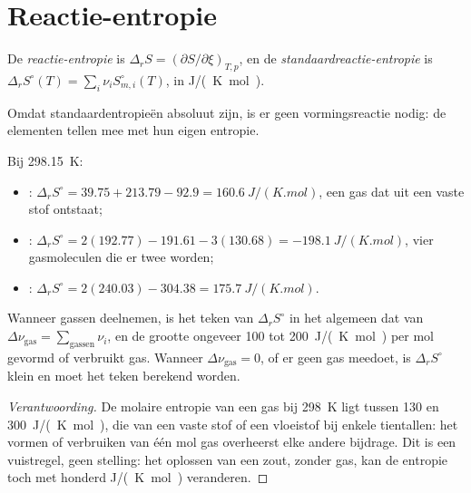 \section{Reactie-entropie}

\begin{definition}\label{def:b2:reaction-free-energy:reaction-entropy}
De \emph{reactie-entropie} is $\Delta_r S =
(\partial S/\partial\xi)_{T,p}$, en de
\emph{standaardreactie-entropie} is $\Delta_r S^\circ(T) =
\sum_i\nu_iS^\circ_{m,i}(T)$, in \unit{J/(K.mol)}.
\end{definition}

Omdat standaardentropieën absoluut zijn, is er geen vormingsreactie nodig:
de elementen tellen mee met hun eigen entropie.

\begin{example}\label{ex:b2:reaction-free-energy:entropies}
Bij \qty{298.15}{K}:
\begin{itemize}
  \item {}: $\Delta_r S^\circ = 39.75 + 213.79 -
        92.9 = \qty{+160.6}{J/(K.mol)}$, een gas dat uit een vaste stof ontstaat;
  \item {}: $\Delta_r S^\circ = 2(192.77) -
        191.61 - 3(130.68) = \qty{-198.1}{J/(K.mol)}$, vier gasmoleculen
        die er twee worden;
  \item {}: $\Delta_r S^\circ = 2(240.03) - 304.38 =
        \qty{+175.7}{J/(K.mol)}$.
\end{itemize}
\end{example}

\begin{proposition}\label{prop:b2:reaction-free-energy:sign-rule}
Wanneer gassen deelnemen, is het teken van $\Delta_r S^\circ$ in het algemeen dat van
$\Delta\nu_{\text{gas}} = \sum_{\text{gassen}}\nu_i$, en de grootte ongeveer
\qty{100}{} tot \qty{200}{J/(K.mol)} per mol gevormd of verbruikt gas. Wanneer
$\Delta\nu_{\text{gas}} = 0$, of er geen gas meedoet, is $\Delta_r S^\circ$
klein en moet het teken berekend worden.
\end{proposition}

\begin{proof}[Verantwoording]
De molaire entropie van een gas bij \qty{298}{K} ligt tussen 130 en
\qty{300}{J/(K.mol)}, die van een vaste stof of een vloeistof bij enkele tientallen: het vormen of
verbruiken van één mol gas overheerst elke andere bijdrage. Dit is een
vuistregel, geen stelling: het oplossen van een zout, zonder gas, kan
de entropie toch met honderd \unit{J/(K.mol)} veranderen.
\end{proof}

